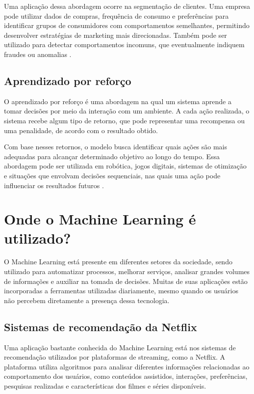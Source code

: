 Uma aplicação dessa abordagem ocorre na segmentação de clientes. Uma empresa pode utilizar dados de compras, frequência de consumo e preferências para identificar grupos de consumidores com comportamentos semelhantes, permitindo desenvolver estratégias de marketing mais direcionadas. Também pode ser utilizado para detectar comportamentos incomuns, que eventualmente indiquem fraudes ou anomalias \cite{googleUnsupervised, ibmML}.

\section{Aprendizado por reforço}

O aprendizado por reforço é uma abordagem na qual um sistema aprende a tomar decisões por meio da interação com um ambiente. A cada ação realizada, o sistema recebe algum tipo de retorno, que pode representar uma recompensa ou uma penalidade, de acordo com o resultado obtido.

Com base nesses retornos, o modelo busca identificar quais ações são mais adequadas para alcançar determinado objetivo ao longo do tempo. Essa abordagem pode ser utilizada em robótica, jogos digitais, sistemas de otimização e situações que envolvam decisões sequenciais, nas quais uma ação pode influenciar os resultados futuros \cite{ibmML, awsML}.

\chapter{Onde o Machine Learning é utilizado?}

O Machine Learning está presente em diferentes setores da sociedade, sendo utilizado para automatizar processos, melhorar serviços, analisar grandes volumes de informações e auxiliar na tomada de decisões. Muitas de suas aplicações estão incorporadas a ferramentas utilizadas diariamente, mesmo quando os usuários não percebem diretamente a presença dessa tecnologia.

\section{Sistemas de recomendação da Netflix}

Uma aplicação bastante conhecida do Machine Learning está nos sistemas de recomendação utilizados por plataformas de streaming, como a Netflix. A plataforma utiliza algoritmos para analisar diferentes informações relacionadas ao comportamento dos usuários, como conteúdos assistidos, interações, preferências, pesquisas realizadas e características dos filmes e séries disponíveis.

